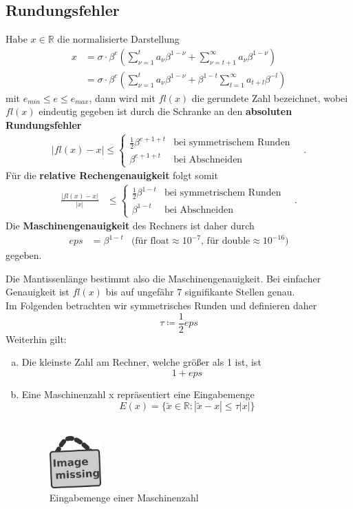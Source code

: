 \documentclass[ngerman,fontsize=11pt, paper=a4, parskip=half, titlepage=true, toc=bib]{scrbook}
\theoremstyle{definition}
\theoremstyle{plain}
\newcommand{\R}{\mathds{R}}
\newcommand{\subsectione}[1]{\addtocounter{Def}{1}\subsection{#1}}
\begin{document}
\subsectione{Rundungsfehler} \label{3.1.6}
Habe $x\in \R $ die normalisierte Darstellung
\begin{align*}
  x &= \sigma \cdot \beta^e (\sum_{\nu=1}^{t}a_{\nu}\beta^{1-\nu} + \sum_{\nu=t+1}^{\infty}a_{\nu}\beta^{1-\nu} ) \\
    &= \sigma \cdot \beta^e (\sum_{\nu=1}^{t}a_{\nu}\beta^{1-\nu} + \beta^{1-t}\sum_{l=1}^{\infty}a_{t+l}\beta^{-l} )
\end{align*}
mit $e_{min} \leq e \leq e_{max}$, dann wird mit $fl(x)$ die gerundete Zahl bezeichnet, wobei $fl(x)$ 
eindeutig gegeben ist durch die Schranke an den \textbf{absoluten Rundungsfehler} 
\begin{align*}
  | fl(x) - x | \leq \begin{cases}
    \frac{1}{2}\beta^{e+1+t} & \text{bei symmetrischem Runden}\\
    \beta^{e+1+t}                    & \text{bei Abschneiden}
  \end{cases} \quad .
\end{align*}
Für die \textbf{relative Rechengenauigkeit} folgt somit 
\begin{align*}
  \frac{| fl(x) - x | }{|x|} & \leq \begin{cases}
    \frac{1}{2}\beta^{1-t} & \text{bei symmetrischem Runden}\\
    \beta^{1-t}                    & \text{bei Abschneiden}
  \end{cases} \quad .
\end{align*}
Die \textbf{Maschinengenauigkeit}  des Rechners ist daher durch 
\begin{align*}
  eps &= \beta^{1-t} & \text{(für float}\approx 10^{-7}  \text{, für double} \approx10^{-16} )
\end{align*}
gegeben.

Die Mantissenlänge bestimmt also die Maschinengenauigkeit. Bei einfacher Genauigkeit ist $fl(x)$ bis auf ungefähr 7 signifikante Stellen genau. \\
Im Folgenden betrachten wir symmetrisches Runden und definieren daher
\[ \tau \coloneqq \frac{1}{2}eps\]
Weiterhin gilt:
\begin{enumerate}[a)]
\item Die kleinste Zahl am Rechner, welche größer als 1 ist, ist
  \[ 1 + eps \]
\item Eine Maschinenzahl x repräsentiert eine Eingabemenge
  \[  E(x) = \{\widetilde{x} \in \R : |\widetilde{x}-x| \leq \tau|x|\} \] \\
  \begin{figure}
    \parbox{\linewidth}{
      \centering
      \includegraphics[width=2cm]{images/image_missing.jpg}
    }
    \caption{Eingabemenge einer Maschinenzahl}
  \end{figure}
\end{enumerate}
\end{document}
